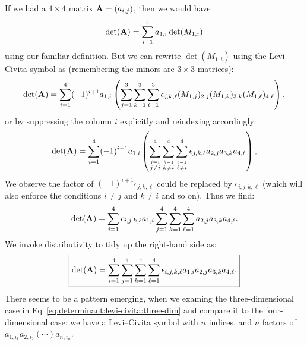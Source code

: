 If we had a $4\times4$ matrix $\mathbf{A}=(a_{i,j})$, then we would have
\begin{equation}
\det(\mathbf{A}) = \sum^{4}_{i=1}a_{1,i}\det(M_{1,i})
\end{equation}
using our familiar definition. But we can rewrite $\det(M_{1,i})$ using
the Levi--Civita symbol as (remembering the minors are $3\times3$ matrices):
\begin{equation}
\det(\mathbf{A}) =
\sum^{4}_{i=1}(-1)^{i+1}a_{1,i}\left(\sum^{3}_{j=1}\sum^{3}_{k=1}\sum^{3}_{\ell=1}\epsilon_{j,k,\ell}(M_{1,j})_{2,j}(M_{1,k})_{3,k}(M_{1,\ell})_{4,\ell}\right),
\end{equation}
or by suppressing the column $i$ explicitly and reindexing accordingly:
\begin{equation}
\det(\mathbf{A}) =
\sum^{4}_{i=1}(-1)^{i+1}a_{1,i}\left(\sum^{4}_{\stackrel{j=1}{j\neq i}}\sum^{4}_{\stackrel{k=1}{k\neq i}}\sum^{4}_{\stackrel{\ell=1}{\ell\neq i}}\epsilon_{j,k,\ell}a_{2,j}a_{3,k}a_{4,\ell}\right),
\end{equation}
We observe the factor of $(-1)^{i+1}\epsilon_{j,k,\ell}$ could be
replaced by $\epsilon_{i,j,k,\ell}$ (which will also enforce the
conditions $i\neq j$ and $k\neq i$ and so on). Thus we find:
\begin{equation}
\det(\mathbf{A}) =
\sum^{4}_{i=1}\epsilon_{i,j,k,\ell}a_{1,i}\sum^{4}_{j=1}\sum^{4}_{k=1}\sum^{4}_{\ell=1}a_{2,j}a_{3,k}a_{4,\ell}.
\end{equation}
We invoke distributivity to tidy up the right-hand side as:
\begin{equation}
\boxed{\det(\mathbf{A}) =
\sum^{4}_{i=1}\sum^{4}_{j=1}\sum^{4}_{k=1}\sum^{4}_{\ell=1}\epsilon_{i,j,k,\ell}a_{1,i}a_{2,j}a_{3,k}a_{4,\ell}.}
\end{equation}
There seems to be a pattern emerging, when we examing the
three-dimensional case in Eq~\eqref{eq:determinant:levi-civita:three-dim}
and compare it to the four-dimensional case: we have a Levi--Civita
symbol with $n$ indices, and $n$ factors of $a_{1,i_{1}}a_{2,i_{2}}(\cdots)a_{n,i_{n}}$.


